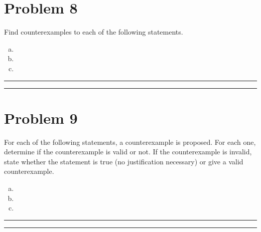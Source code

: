 \documentclass{article}
\theoremstyle{definition}
\newenvironment{solution}{\bigskip\hrule{\hfill}}{\bigskip\hrule{\hfill}} %
\begin{document}
\newpage


\section*{Problem 8}

Find counterexamples to each of the following statements.

\begin{enumerate}[a)] %
    \item 

    \item 

    \item 
\end{enumerate}

\begin{solution}


\end{solution}


\newpage


\section*{Problem 9}

For each of the following statements, a counterexample is proposed. For each one, determine if the counterexample is valid or not. If the counterexample is invalid, state whether the statement is true (no justification necessary) or give a valid counterexample.

\begin{enumerate}[a)] %
    \item 

    \item 

    \item 
\end{enumerate}

\begin{solution}


\end{solution}

\end{document}
